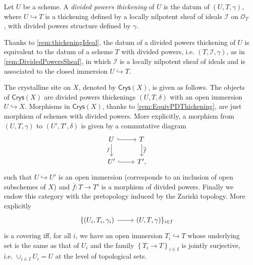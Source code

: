 \documentclass[../Main]{subfiles}
\begin{document}
\begin{defn}
	Let $U$ be a scheme. A {\em divided powers thickening} of $U$ 
	is the datum of $\left(U, T, \gamma\right)$,
	where $U \hookrightarrow T$ is a thickening defined by a locally nilpotent
	sheaf of ideals $\mathcal{I}$ on $\mathcal{O}_T$, 
	with divided powers structure defined by $\gamma$.
\end{defn}


\begin{rem}[]\label{rem:EquivPDThickening}
	Thanks to \cref{rem:thickeningIdeal}, the datum of a
	divided powers thickening of $U$ is equivalent to the datum of
	a scheme $T$ with divided powers, i.e.
	$\left(T, \mathcal{I}, \gamma\right)$, as in \cref{rem:DividedPowersSheaf},
	in which $\mathcal{I}$ is a locally nilpotent sheaf of ideals
	and is associated to the closed immersion $U \hookrightarrow T$.
\end{rem}


\begin{defn}
	The crystalline site on $X$, denoted by $\mathsf{Crys}(X)$,
	is given as follows.
	The objects of $\mathsf{Crys}(X)$ are
	divided powers thickenings $\left(U, T, \delta\right)$
	with an open immersion $U \hookrightarrow X$.
	Morphisms in $\mathsf{Crys}(X)$, thanks to \cref{rem:EquivPDThickening},
	are just morphism of schemes with divided powers.
	More explicitly, a morphism from $\left(U, T, \gamma\right)$
	to $\left(U', T', \delta\right)$ is given by a commutative
	diagram
	\begin{equation}\label{diag:MorphDivPowers}
	\begin{tikzcd}
		U \arrow[d, "f"', rightarrow] \arrow[r, "", hookrightarrow] &
		T \arrow[d, "\overline{f}", rightarrow] \\
		U' \arrow[r, "", hookrightarrow] &
		T'
	,\end{tikzcd}
	\end{equation}
	such that $U \hookrightarrow U'$ is an open immersion (corresponds to
	an inclusion of open subschemes of $X$) and
	$\overline{f}\colon T \to T'$ is a morphism of divided powers.
	Finally we endow this category with the pretopology induced by the
	Zariski topology.
	More explicitly 
	\begin{equation*}
	\begin{tikzcd}
		\{ \left(U_i, T_i, \gamma_i\right)
		\arrow[r, "", rightarrow] &
		\left(U, T, \gamma\right) \}_{i \in I}
	\end{tikzcd}
	\end{equation*}
	is a covering iff, for all $i$, we have an open immersion
	$T_i \hookrightarrow T$ whose underlying set is the same as
	that of $U_i$ and the family $\left\{ T_i \to T \right\}_{i \in I}$
	is jointly surjective, i.e. $\cup_{i \in I} U_i = U$ at
	the level of topological sets.
\end{defn}
\end{document}
